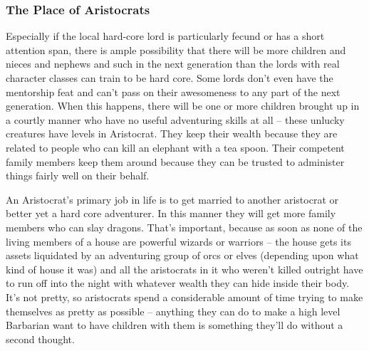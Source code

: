 \subsubsection{The Place of Aristocrats}

Especially if the local hard-core lord is particularly fecund or has a short attention span, there is ample possibility that there will be more children and nieces and nephews and such in the next generation than the lords with real character classes can train to be hard core. Some lords don't even have the mentorship feat and can't pass on their awesomeness to any part of the next generation. When this happens, there will be one or more children brought up in a courtly manner who have no useful adventuring skills at all -- these unlucky creatures have levels in Aristocrat. They keep their wealth because they are related to people who can kill an elephant with a tea spoon. Their competent family members keep them around because they can be trusted to administer things fairly well on their behalf.

An Aristocrat's primary job in life is to get married to another aristocrat or better yet a hard core adventurer. In this manner they will get more family members who can slay dragons. That's important, because as soon as none of the living members of a house are powerful wizards or warriors -- the house gets its assets liquidated by an adventuring group of orcs or elves (depending upon what kind of house it was) and all the aristocrats in it who weren't killed outright have to run off into the night with whatever wealth they can hide inside their body. It's not pretty, so aristocrats spend a considerable amount of time trying to make themselves as pretty as possible -- anything they can do to make a high level Barbarian want to have children with them is something they'll do without a second thought.
